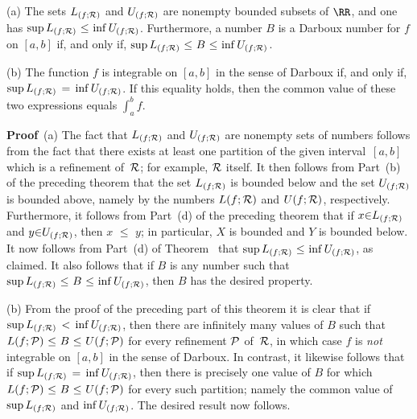 \V

        (a) The sets $L_{(f;{\cal R})}$ and $U_{(f;{\cal R})}$ are nonempty bounded subsets of ${\RR}$, and one has ${\sup}\,L_{(f;{\cal R})}\,\,{\leq}\,\,{\inf}\,U_{(f;{\cal R})}$.
    Furthermore, a number $B$ is a Darboux number for $f$ on $[a,b]$ if, and only if, ${\sup}\,L_{(f;{\cal R})}\,\,{\leq}\,\,B\,\,{\leq}\,\,{\inf}\,U_{(f;{\cal R})}$.

\V

        (b) The function $f$ is integrable on $[a,b]$ in the sense of Darboux if, and only if, ${\sup}\,L_{(f;{\cal R})} \,=\, {\inf}\,U_{(f;{\cal R})}$.
    If this equality holds, then the common value of these two expressions equals ${\displaystyle \int_{a}^{b} f}$.

\V

        {\bf Proof}\, (a) The fact that $L_{(f;{\cal R})}$ and $U_{(f;{\cal R})}$ are nonempty sets of numbers follows from the fact that
    there exists at least one partition of the given interval~$[a,b]$ which is a refinement of~${\cal R}$; for example, ${\cal R}$ itself.
    It then follows from Part~(b) of the preceding theorem that the set $L_{(f;{\cal R})}$ is bounded below and the set $U_{(f;{\cal R})}$ is bounded above,
    namely by the numbers $L(f;{\cal R})$ and $U(f;{\cal R})$, respectively. Furthermore, it follows from Part~(d) of the preceding theorem that if $x{\in}L_{(f;{\cal R})}$ and $y{\in}U_{(f;{\cal R})}$,
    then $x\,\,{\leq}\,\,y$; in particular, $X$ is bounded and $Y$ is bounded below. It now follows from Part~(d) of Theorem~ that ${\sup}\,L_{(f;{\cal R})}\,\,{\leq}\,\,{\inf}\,U_{(f;{\cal R})}$, as claimed.
    It also follows that if $B$ is any number such that  ${\sup}\,L_{(f;{\cal R})}\,\,{\leq}\,\,B\,\,{\leq}\,\,{\inf}\,U_{(f;{\cal R})}$, then $B$ has the desired property.

\V

        (b) From the proof of the preceding part of this theorem it is clear that if ${\sup}\,L_{(f;{\cal R})}\,<\,{\inf}\,U_{(f;{\cal R})}$,
    then there are infinitely many values of $B$ such that $L(f;{\cal P})\,\,{\leq}\,\,B\,\,{\leq}\,\,U(f;{\cal P})$
    for every refinement ${\cal P}$ of~${\cal R}$, in which case $f$ is {\em not} integrable on $[a,b]$ in the sense of Darboux.
    In contrast, it likewise follows that if ${\sup}\,L_{(f;{\cal R})} \,=\, {\inf}\,U_{(f;{\cal R})}$, then there is precisely one value of $B$ for which
    $L(f;{\cal P})\,\,{\leq}\,\,B\,\,{\leq}\,\,U(f;{\cal P})$ for every such partition; namely the common value of ${\sup}\,L_{(f;{\cal R})}$ and ${\inf}\,U_{(f;{\cal R})}$. The desired result now follows. \Q

